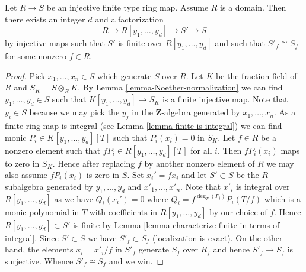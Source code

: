 \begin{lemma}
\label{lemma-Noether-normalization-over-a-domain}
Let $R \to S$ be an injective finite type ring map. Assume $R$ is a domain.
Then there exists an integer $d$ and a factorization
$$
R \to R[y_1, \ldots, y_d] \to S' \to S
$$
by injective maps such that $S'$ is finite over $R[y_1, \ldots, y_d]$
and such that $S'_f \cong S_f$ for some nonzero $f \in R$.
\end{lemma}

\begin{proof}
Pick $x_1, \ldots, x_n \in S$ which generate $S$ over $R$.
Let $K$ be the fraction field of $R$ and $S_K = S \otimes_R K$.
By Lemma \ref{lemma-Noether-normalization}
we can find $y_1, \ldots, y_d \in S$ such that $K[y_1, \ldots, y_d] \to S_K$
is a finite injective map. Note that $y_i \in S$ because we may pick the
$y_j$ in the $\mathbf{Z}$-algebra generated by $x_1, \ldots, x_n$.
As a finite ring map is integral (see
Lemma \ref{lemma-finite-is-integral})
we can find monic $P_i \in K[y_1, \ldots, y_d][T]$ such that
$P_i(x_i) = 0$ in $S_K$. Let $f \in R$ be a nonzero element such that
$fP_i \in R[y_1, \ldots, y_d][T]$ for all $i$. Then $fP_i(x_i)$
maps to zero in $S_K$. Hence after replacing $f$ by another
nonzero element of $R$ we may also assume $fP_i(x_i)$ is zero in $S$.
Set $x_i' = fx_i$ and let $S' \subset S$ be the $R$-subalgebra generated by
$y_1, \ldots, y_d$ and $x'_1, \ldots, x'_n$. Note that $x'_i$ is integral over
$R[y_1, \ldots, y_d]$ as we have $Q_i(x_i') = 0$ where
$Q_i = f^{\deg_T(P_i)}P_i(T/f)$ which is a monic polynomial in
$T$ with coefficients in $R[y_1, \ldots, y_d]$ by our choice of $f$.
Hence $R[y_1, \ldots, y_d] \subset S'$ is finite by
Lemma \ref{lemma-characterize-finite-in-terms-of-integral}.
Since $S' \subset S$ we have $S'_f \subset S_f$ (localization is exact).
On the other hand, the elements $x_i = x'_i/f$ in $S'_f$ generate $S_f$
over $R_f$ and hence $S'_f \to S_f$ is surjective. Whence
$S'_f \cong S_f$ and we win.
\end{proof}
